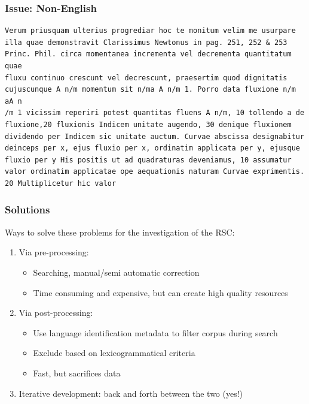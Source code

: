 \documentclass{beamer}       %
\begin{document}
\begin{frame}[fragile]
\frametitle{Issue: Non-English}
\footnotesize
\begin{verbatim}
Verum priusquam ulterius progrediar hoc te monitum velim me usurpare 
illa quae demonstravit Clarissimus Newtonus in pag. 251, 252 & 253 
Princ. Phil. circa momentanea incrementa vel decrementa quantitatum quae 
fluxu continuo crescunt vel decrescunt, praesertim quod dignitatis 
cujuscunque A n/m momentum sit n/ma A n/m 1. Porro data fluxione n/m aA n
/m 1 vicissim reperiri potest quantitas fluens A n/m, 10 tollendo a de 
fluxione,20 fluxionis Indicem unitate augendo, 30 denique fluxionem 
dividendo per Indicem sic unitate auctum. Curvae abscissa designabitur 
deinceps per x, ejus fluxio per x, ordinatim applicata per y, ejusque 
fluxio per y His positis ut ad quadraturas deveniamus, 10 assumatur 
valor ordinatim applicatae ope aequationis naturam Curvae exprimentis. 
20 Multiplicetur hic valor 
\end{verbatim}
\end{frame}

\begin{frame}\frametitle{Solutions}
    Ways to solve these problems for the investigation of the RSC:
    \begin{enumerate}
        \item Via pre-processing:
        \begin{itemize}
            \item Searching, manual\slash semi automatic correction
            \item Time consuming and expensive, but can create high quality resources
        \end{itemize}
        \item Via post-processing:
    \begin{itemize}
        \item Use language identification metadata to filter corpus during search
        \item Exclude based on lexicogrammatical criteria
        \item Fast, but sacrifices data
    \end{itemize}
    \item Iterative development: back and forth between the two (yes!)
    \end{enumerate}
\end{frame}
\end{document}
